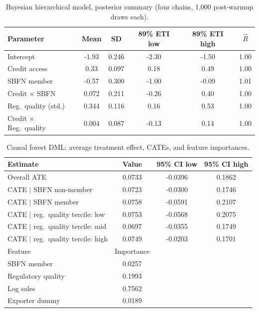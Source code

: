 \documentclass[review,authoryear,12pt]{elsarticle}
\begin{document}
\begin{table}[htbp]
\centering
\caption{Bayesian hierarchical model, posterior summary (four chains, 1{,}000 post-warmup draws each).}
\label{tab:multilevel}
\begin{tabular}{lccccc}
\toprule
Parameter & Mean & SD & 89\% ETI low & 89\% ETI high & $\hat{R}$ \\
\midrule
Intercept & -1.93 & 0.246 & -2.30 & -1.50 & 1.00 \\
Credit access & 0.33 & 0.097 & 0.18 & 0.49 & 1.00 \\
SBFN member & -0.57 & 0.300 & -1.00 & -0.09 & 1.01 \\
Credit $\times$ SBFN & 0.072 & 0.211 & -0.26 & 0.40 & 1.00 \\
Reg.\ quality (std.) & 0.344 & 0.116 & 0.16 & 0.53 & 1.00 \\
Credit $\times$ Reg.\ quality & 0.004 & 0.087 & -0.13 & 0.14 & 1.00 \\
\bottomrule
\end{tabular}
\end{table}

\begin{table}[htbp]
\centering
\caption{Causal forest DML: average treatment effect, CATEs, and feature importances.}
\label{tab:causalforest}
\begin{tabular}{lccc}
\toprule
Estimate & Value & 95\% CI low & 95\% CI high \\
\midrule
Overall ATE & 0.0733 & -0.0396 & 0.1862 \\
CATE $\vert$ SBFN non-member & 0.0723 & -0.0300 & 0.1746 \\
CATE $\vert$ SBFN member & 0.0758 & -0.0591 & 0.2107 \\
CATE $\vert$ reg.\ quality tercile: low & 0.0753 & -0.0568 & 0.2075 \\
CATE $\vert$ reg.\ quality tercile: mid & 0.0697 & -0.0355 & 0.1749 \\
CATE $\vert$ reg.\ quality tercile: high & 0.0749 & -0.0203 & 0.1701 \\
\midrule
Feature & Importance & & \\
\midrule
SBFN member & 0.0257 & & \\
Regulatory quality & 0.1993 & & \\
Log sales & 0.7562 & & \\
Exporter dummy & 0.0189 & & \\
\bottomrule
\end{tabular}
\end{table}
\end{document}
